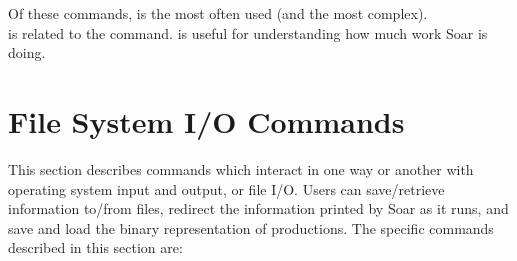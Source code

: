 Of these commands,  is the most often used (and the most complex). \\
 is related to the  command.  is useful for understanding how much work Soar is doing.

\subdivider 


\divider 


\divider 


\divider 


\divider 


\divider 


\divider 



\section{File System I/O Commands}
\label{INTERFACE-file-io}

This section describes commands which interact in one way or another with operating system input and output, or file I/O.  Users can save/retrieve information to/from files, redirect the information printed by Soar as it runs, and save and load the binary representation of productions. The specific commands described in this section are:

